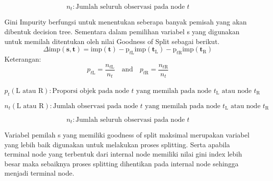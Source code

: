    \begin{equation}
    n_{t} : \text{Jumlah seluruh observasi pada node } t
    \end{equation}
    

Gini Impurity berfungsi untuk menentukan seberapa banyak pemisah yang akan dibentuk decision tree. Sementara dalam pemilihan variabel s yang digunakan untuk memilah ditentukan oleh nilai Goodness of Split sebagai berikut.
\begin{equation}
    \Delta\text{imp}(\mathbf{s}, \mathbf{t}) = \text{imp}(\mathbf{t}) - \text{p}_{t\text{L}}\text{imp}(\mathbf{t}_{\text{L}}) - \text{p}_{t\text{R}}\text{imp}(\mathbf{t}_{\text{R}})
    \end{equation}
Keterangan:
\begin{equation}
    p_{t\text{L}} = \frac{n_{t\text{L}}}{n_{t}} \quad \text{and} \quad p_{t\text{R}} = \frac{n_{t\text{R}}}{n_{t}}
    \end{equation}
\\
\begin{equation}
    p_{t}(\text{L atau R}) : \text{Proporsi objek pada node } t \text{ yang memilah pada node } t_{\text{L}} \text{ atau node } t_{\text{R}}
    \end{equation}
    
    \begin{equation}
    n_{t}(\text{L atau R}) : \text{Jumlah observasi pada node } t \text{ yang memilah pada node } t_{\text{L}} \text{ atau node } t_{\text{R}}
    \end{equation}
    
    \begin{equation}
    n_{t} : \text{Jumlah seluruh observasi pada node } t
    \end{equation}
    
Variabel pemilah s yang memiliki goodness of split maksimal merupakan variabel yang lebih baik digunakan untuk melakukan proses splitting. Serta apabila terminal node yang terbentuk dari internal node memiliki nilai gini index lebih besar maka sebaiknya proses splitting dihentikan pada internal node sehingga menjadi terminal node.

